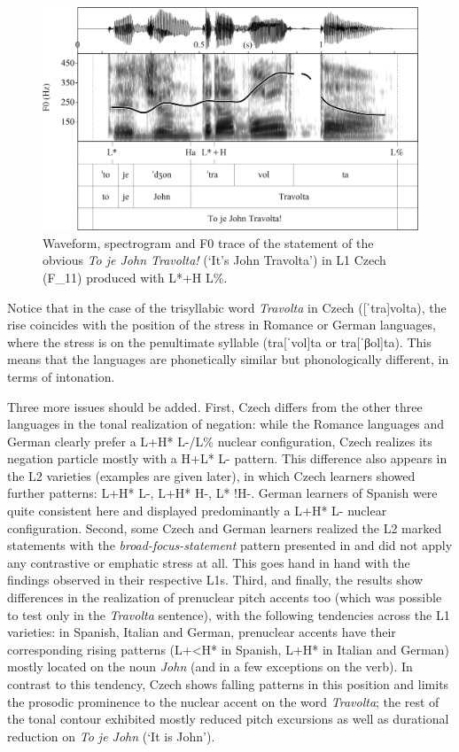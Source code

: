 \begin{figure}
\includegraphics[width=\textwidth]{figures/Figure_4.35.png}
\caption{Waveform, spectrogram and F0 trace of the statement of the obvious \textit{To je John Travolta!} (‘It’s John Travolta’) in L1 Czech \mbox{(F\_11)} produced with L*+H L\%.}
\label{fig:4.35}
\end{figure}


Notice that in the case of the trisyllabic word \textit{Travolta} in Czech ([ˈtra]volta), the rise coincides with the position of the stress in Romance or German languages, where the stress is on the penultimate syllable (tra[ˈvol]ta or tra[ˈβol]ta). This means that the languages are phonetically similar but phonologically different, in terms of intonation.



Three more issues should be added. First, Czech differs from the other three languages in the tonal realization of negation: while the Romance languages and German clearly prefer a L+H* L-/L\% nuclear configuration, Czech realizes its negation particle mostly with a H+L* L- pattern. This difference also appears in the L2 varieties (examples are given later), in which Czech learners showed further patterns: L+H* L-, L+H* H-, L* !H-. German learners of Spanish were quite consistent here and displayed predominantly a L+H* L- nuclear configuration. Second, some Czech and German learners realized the L2 marked statements with the \textit{broad-focus-statement} pattern presented in  and did not apply any contrastive or emphatic stress at all. This goes hand in hand with the findings observed in their respective L1s. Third, and finally, the results show differences in the realization of prenuclear pitch accents too (which was possible to test only in the \textit{Travolta}{} sentence), with the following tendencies across the L1 varieties: in Spanish, Italian and German, prenuclear accents have their corresponding rising patterns (L+<H* in Spanish, L+H* in Italian and German) mostly located on the noun \textit{John} (and in a few exceptions on the verb). In contrast to this tendency, Czech shows falling patterns in this position and limits the prosodic prominence to the nuclear accent on the word \textit{Travolta}; the rest of the tonal contour exhibited mostly reduced pitch excursions as well as durational reduction on \textit{To je John} (‘It is John’).


